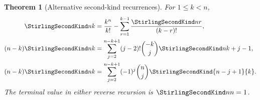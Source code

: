 \documentclass[11pt,a4paper,oneside,openany]{book}
\newtheorem{theorem}{Theorem}[chapter]
\theoremstyle{definition}
\theoremstyle{remark}
\begin{document}
\begin{theorem}[Alternative second-kind recurrences]
\label{thm:second-reverse-recurrences}
For $1\le k<n$,
\begin{align}
 \StirlingSecondKind nk
 &=\frac{k^n}{k!}-\sum_{r=1}^{k-1}\frac{\StirlingSecondKind nr}{(k-r)!},
 \label{eq:second-triangular-explicit}\\
 (n-k)\StirlingSecondKind nk
 &=\sum_{j=2}^{n-k+1}(j-2)!\binom{-k}{j}
   \StirlingSecondKind n{k+j-1},
 \label{eq:second-reverse-row}\\
 (n-k)\StirlingSecondKind nk
 &=\sum_{j=2}^{n-k+1}(-1)^j\binom nj
   \StirlingSecondKind{n-j+1}{k}.
 \label{eq:second-reverse-column}
\end{align}
The terminal value in either reverse recursion is $\StirlingSecondKind nn=1$.
\end{theorem}
\end{document}
